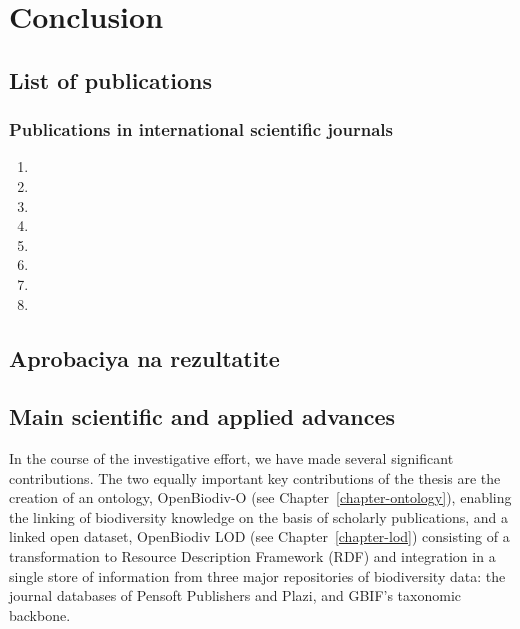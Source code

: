 \chapter{Conclusion}
\label{chapter:summary}

\section{List of publications}

\subsection{Publications in international scientific journals}

\begin{enumerate}
\item {}
\item {}
\item {}
\item {}
\item {}
\item {}
\item {}
\item {}
\end{enumerate}

\section{Aprobaciya na rezultatite}

\section{Main scientific and applied advances}

In the course of the investigative effort, we have made several significant contributions. The two equally important key contributions of the thesis are the creation of an ontology, OpenBiodiv-O (see Chapter~\ref{chapter-ontology}), enabling the linking of biodiversity knowledge on the basis of scholarly publications, and a linked open dataset, OpenBiodiv LOD (see Chapter~\ref{chapter-lod}) consisting of a transformation to Resource Description Framework (RDF) and integration in a single store of information from three major repositories of biodiversity data: the journal databases of Pensoft Publishers and Plazi, and GBIF's taxonomic backbone.

